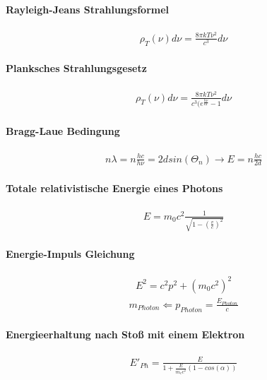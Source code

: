 \documentclass[10pt,a4paper]{article}
\begin{document}
\paragraph{Rayleigh-Jeans Strahlungsformel}$\,$ \\
\begin{align}
\rho_T(\nu)d\nu=\frac{8\pi k T \nu^2}{c^3}d\nu
\end{align}
\paragraph{Planksches Strahlungsgesetz}$\,$ \\
\begin{align}
\rho_T(\nu)d\nu=\frac{8\pi k T \nu^2}{c^3(e^{\frac{h\nu}{kT}}-1}d\nu
\end{align}
\paragraph{Bragg-Laue Bedingung}$\,$ \\
\begin{align}
n\lambda = n \frac{hc}{h\nu} = 2d sin(\Theta_n) \longrightarrow E = n \frac{hc}{2d}
\end{align}
\paragraph{Totale relativistische Energie eines Photons}$\,$ \\
\begin{align}
E=m_0 c^2 \frac{1}{\sqrt{1-(\frac{v}{c})^2}}
\end{align}
\paragraph{Energie-Impuls Gleichung}$\,$ \\
\begin{align}
E^2=c^2 p^2+(m_0c^2)^2
\end{align}
\begin{align}
m_{Photon} \Leftarrow p_{Photon} = \frac{E_{Photon}}{c}
\end{align}
\paragraph{Energieerhaltung nach Stoß mit einem Elektron}$\,$ \\
\begin{align}
E'_{Ph}=\frac{E}{1+\frac{E}{m_e c^2}(1-cos(\alpha))}
\end{align}
\end{document}
